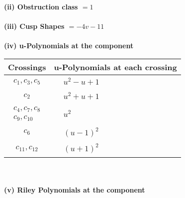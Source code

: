 \documentclass[1p]{elsarticle_modified}
\theoremstyle{definition}
\begin{document}
\flushleft \textbf{(ii) Obstruction class $= 1$}\\~\\
\flushleft \textbf{(iii) Cusp Shapes $= -4 v-11$}\\~\\
\newpage\renewcommand{\arraystretch}{1}
\flushleft \textbf{(iv) u-Polynomials at the component}\newline \\
\begin{tabular}{m{50pt}|m{274pt}}
Crossings & \hspace{64pt}u-Polynomials at each crossing \\
\hline $$\begin{aligned}c_{1},c_{3},c_{5}\end{aligned}$$&$\begin{aligned}
&u^2- u+1
\end{aligned}$\\
\hline $$\begin{aligned}c_{2}\end{aligned}$$&$\begin{aligned}
&u^2+u+1
\end{aligned}$\\
\hline $$\begin{aligned}c_{4},c_{7},c_{8}\\c_{9},c_{10}\end{aligned}$$&$\begin{aligned}
&u^2
\end{aligned}$\\
\hline $$\begin{aligned}c_{6}\end{aligned}$$&$\begin{aligned}
&(u-1)^2
\end{aligned}$\\
\hline $$\begin{aligned}c_{11},c_{12}\end{aligned}$$&$\begin{aligned}
&(u+1)^2
\end{aligned}$\\
\hline
\end{tabular}\\~\\
\newpage\renewcommand{\arraystretch}{1}
\flushleft \textbf{(v) Riley Polynomials at the component}\newline \\
\end{document}
